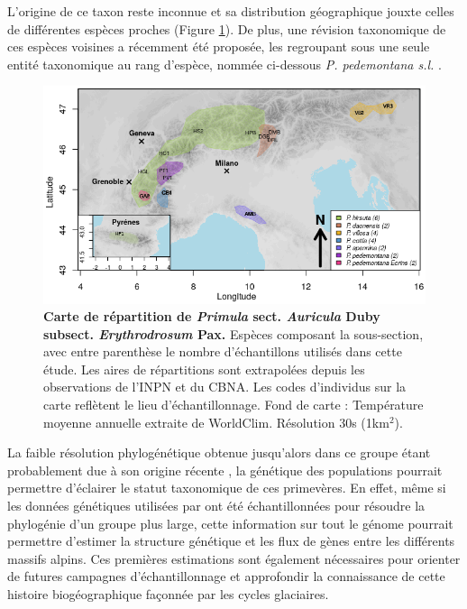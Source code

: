 L'origine de ce taxon reste inconnue et sa distribution géographique jouxte celles de différentes espèces proches (Figure \ref{carte}). De plus, une révision taxonomique de ces espèces voisines a récemment été proposée, les regroupant sous une seule entité taxonomique au rang d'espèce, nommée ci-dessous \textit{P. pedemontana s.l.} \citep{Boucher2016a}. 

\begin{figure}[!ht]
    \centering
    \includegraphics[width=1\textwidth]{fig/carte.png}
    \caption{\textbf{Carte de répartition de \textit{Primula} sect. \textit{Auricula} Duby subsect. \textit{Erythrodrosum} Pax.} Espèces composant la sous-section, avec entre parenthèse le nombre d'échantillons utilisés dans cette étude. Les aires de répartitions sont extrapolées depuis les observations de l'INPN et du CBNA. Les codes d'individus sur la carte reflètent le lieu d'échantillonnage. Fond de carte : Température moyenne annuelle extraite de WorldClim. Résolution 30s (1km$^{2}$).}
    \label{carte}
    \centering
\end{figure} 

La faible résolution phylogénétique obtenue jusqu'alors dans ce groupe étant probablement due à son origine récente \citep{Boucher2016} , la génétique des populations pourrait permettre d'éclairer le statut taxonomique de ces primevères. En effet, même si les données génétiques utilisées par \citet{Boucher2016a} ont été échantillonnées pour résoudre la phylogénie d'un groupe plus large, cette information sur tout le génome pourrait permettre d'estimer la structure génétique et les flux de gènes entre les différents massifs alpins. Ces premières estimations sont également nécessaires pour orienter de futures campagnes d'échantillonnage et approfondir la connaissance de cette histoire biogéographique façonnée par les cycles glaciaires. 

